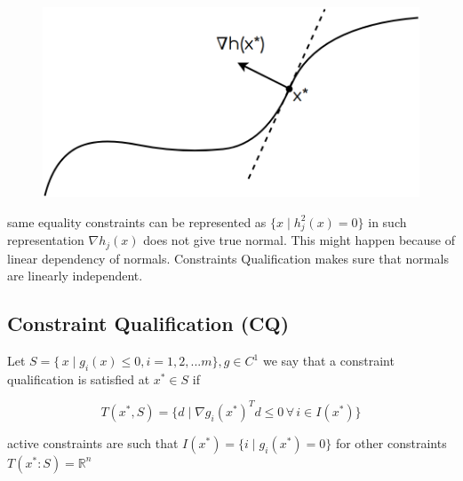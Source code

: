 \documentclass[twoside]{article}
\begin{document}
\begin{figure}[h]
\center
\includegraphics[scale=0.25]{images/pic7.png}
\end{figure}

same equality constraints can be represented as $\{ x \mid h^{2}_{j}(x) = 0\}$ in such representation $\nabla h_j(x)$ does not give true normal. This might happen because of linear dependency of normals. Constraints Qualification makes sure that normals are linearly independent.



\subsection{Constraint Qualification (CQ)}
Let $S = \{\,x\mid g_{i}(x)\leq 0 , i = 1,2,...m\},g \in C^{1}  $ we say that a constraint qualification is satisfied at $x^{*}\in S$ if 

$$ T(x^{*},S) = \{d \mid \nabla g_i(x^*)^Td \leq 0\, \forall\, i \in I(x^*)\}$$

active constraints are such that 
$I(x^*)=\{i\mid g_i(x^*)=0\}$
for other constraints $T(x^*:S)= \mathbb{R}^n$
\end{document}
